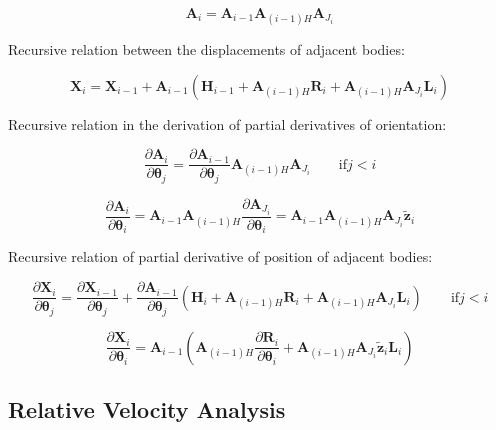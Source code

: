 \documentclass{article}
\begin{document}
\begin{equation}
	\mathbf{A}_i = \mathbf{A}_{i-1}
\mathbf{A}_{(i-1)H}\mathbf{A}_{J_i}
\end{equation}

Recursive relation between the displacements of adjacent bodies:

\begin{equation}
	\mathbf{X}_i = \mathbf{X}_{i-1} + \mathbf{A}_{i-1}({\mathbf H}_{i-1}+\mathbf{A}_{(i-1)H}{\mathbf R}_i+\mathbf{A}_{(i-1)H}\mathbf{A}_{J_i}{\mathbf L}_i)
\end{equation}

Recursive relation in the derivation of partial derivatives of orientation:

\begin{equation}
	\frac{\partial \mathbf{A}_i}{\partial \mathbf{\theta}_j} =
	\frac{\partial \mathbf{A}_{i-1}}{\partial \mathbf{\theta}_j} \mathbf{A}_{(i-1)H}\mathbf{A}_{J_i}
	\qquad \textrm{if} j < i
\end{equation}

\begin{equation}
	\frac{\partial \mathbf{A}_i}{\partial \mathbf{\theta}_i} 
=\mathbf{A}_{i-1}\mathbf{A}_{(i-1)H} \frac{\partial \mathbf{A}_{J_i}}{\partial \mathbf{\theta}_i}
=\mathbf{A}_{i-1}\mathbf{A}_{(i-1)H} \mathbf{A}_{J_i}\tilde{\mathbf{z}}_i
\end{equation}


Recursive relation of partial derivative of position of adjacent bodies:

\begin{equation}
\frac{\partial \mathbf{X}_i}{\partial \mathbf{\theta}_j} =
\frac{\partial \mathbf{X}_{i-1}}{\partial \mathbf{\theta}_{j}}+\frac{\partial \mathbf{A}_{i-1}}{\partial \mathbf{\theta}_{j}}(\mathbf{H}_{i}+\mathbf{A}_{(i-1)H}\mathbf{R}_i+
\mathbf{A}_{(i-1)H}\mathbf{A}_{J_i}\mathbf{L}_i) 
	\qquad \textrm{if} j < i
\end{equation}

\begin{equation}
\frac{\partial \mathbf{X}_i}{\partial \mathbf{\theta}_i} =
\mathbf{A}_{i-1}(\mathbf{A}_{(i-1)H}\frac{\partial \mathbf{R}_i}{\partial \mathbf{\theta}_i}+\mathbf{A}_{(i-1)H}\mathbf{A}_{J_i}\tilde{\mathbf z}_i\mathbf{L}_i)
\end{equation}

\subsection{Relative Velocity Analysis}
\end{document}

